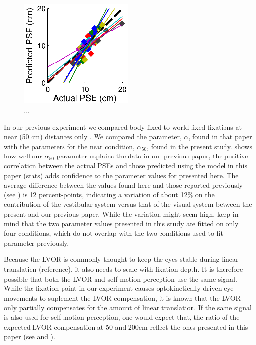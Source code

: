 \begin{figure}
    \includegraphics[width=0.5\textwidth]{src/paper4/paper4_figure6.eps}

    \caption{...}
    \label{p4:fig6}
\end{figure}

In our previous experiment we compared body-fixed to world-fixed fixations at near (50 \si{\centi\metre}) distances only \cite{clemens2015a}. We compared the parameter, $\alpha$, found in that paper with the parameters for the near condition, $\alpha_{50}$, found in the present study.  shows how well our $\alpha_{50}$ parameter explains the data in our previous paper, the positive correlation between the actual PSEs and those predicted using the model in this paper (stats) adds confidence to the parameter values for  presented here. The average difference between the values found here and those reported previously (see ) is 12  percent-points, indicating a variation of about 12\% on the contribution of the vestibular system versus that of the visual system between the present and our previous paper. While the variation might seem high, keep in mind that the two parameter values presented in this study are fitted on only four conditions, which do not overlap with the two conditions used to fit  parameter  previously.

Because the LVOR is commonly thought to keep the eyes stable during linear translation (reference), it also needs to scale with fixation depth. It is therefore possible that both the LVOR and self-motion perception use the same signal. While the fixation point in our experiment causes optokinetically driven eye movements to suplement the LVOR compensation, it is known that the LVOR only partially compensates for the amount of linear translation. If the same signal is also used for self-motion perception, one would expect that, the ratio of the expected LVOR compensation at 50 and 200cm reflect the ones presented in this paper (see  and ).

